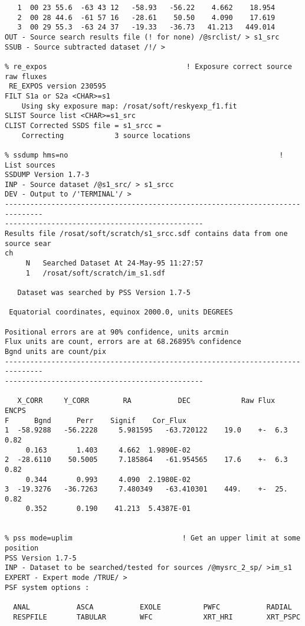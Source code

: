 \begin{small}
\begin{verbatim}
   1  00 23 55.6  -63 43 12   -58.93   -56.22    4.662    18.954
   2  00 28 44.6  -61 57 16   -28.61    50.50    4.090    17.619
   3  00 29 55.3  -63 24 37   -19.33   -36.73   41.213   449.014
OUT - Source search results file (! for none) /@srclist/ > s1_src
SSUB - Source subtracted dataset /!/ >

% re_expos                                 ! Exposure correct source raw fluxes
 RE_EXPOS version 230595
FILT S1a or S2a <CHAR>=s1
    Using sky exposure map: /rosat/soft/reskyexp_f1.fit
SLIST Source list <CHAR>=s1_src
CLIST Corrected SSDS file = s1_srcc =
    Correcting            3 source locations

% ssdump hms=no                                                  ! List sources
SSDUMP Version 1.7-3
INP - Source dataset /@s1_src/ > s1_srcc
DEV - Output to /'TERMINAL'/ >
-------------------------------------------------------------------------------
-----------------------------------------------
Results file /rosat/soft/scratch/s1_srcc.sdf contains data from one source sear
ch
     N   Searched Dataset At 24-May-95 11:27:57
     1   /rosat/soft/scratch/im_s1.sdf

   Dataset was searched by PSS Version 1.7-5

 Equatorial coordinates, equinox 2000.0, units DEGREES

Positional errors are at 90% confidence, units arcmin
Flux units are count, errors are at 68.26895% confidence
Bgnd units are count/pix
-------------------------------------------------------------------------------
-----------------------------------------------

   X_CORR     Y_CORR        RA           DEC            Raw Flux          ENCPS
F      Bgnd      Perr    Signif    Cor_Flux
1  -58.9288   -56.2228     5.981595   -63.720122    19.0    +-  6.3       0.82
     0.163       1.403     4.662  1.9890E-02
2  -28.6110    50.5005     7.185864   -61.954565    17.6    +-  6.3       0.82
     0.344       0.993     4.090  2.1980E-02
3  -19.3276   -36.7263     7.480349   -63.410301    449.    +-  25.       0.82
     0.352       0.190    41.213  5.4387E-01


% pss mode=uplim                          ! Get an upper limit at some position
PSS Version 1.7-5
INP - Dataset to be searched/tested for sources /@mysrc_2_sp/ >im_s1
EXPERT - Expert mode /TRUE/ >
PSF system options :

  ANAL           ASCA           EXOLE          PWFC           RADIAL
  RESPFILE       TABULAR        WFC            XRT_HRI        XRT_PSPC


\end{verbatim}
\end{small}
